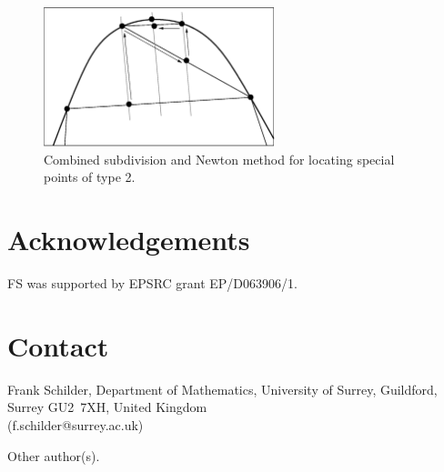 \documentclass[twoside,draft,a4paper]{article}
\begin{document}
\begin{figure}
\centerline{\includegraphics[width=0.6\textwidth]{figs/bisec1.eps}}
\caption{Combined subdivision and Newton method for locating special points of type 2.}
\label{frank:fig1}
\end{figure}


















\section{Acknowledgements}

FS was supported by EPSRC grant EP/D063906/1.

\section{Contact}

Frank Schilder, Department of Mathematics,
University of Surrey,
Guildford, Surrey \mbox{GU2 7XH},
United Kingdom \\
(f.schilder@surrey.ac.uk)

\vspace{2ex}\noindent Other author(s).


\appendix
\renewcommand{\theequation}{\Alph{section}.\arabic{equation}}




\end{document}
